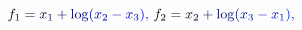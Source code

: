 \documentclass[12pt]{article}
\begin{document}
\makeatletter
\renewcommand*{\@textcolor}[3]{%
  \protect\leavevmode
  \begingroup
    \color#1{#2}#3%
  \endgroup
}
\makeatother
\begin{displaymath}
\mathcolor[RGB]{0,0,15}{f} _ { \mathcolor[RGB]{0,0,30}{1} } \mathcolor[RGB]{0,0,45}{=} \mathcolor[RGB]{0,0,60}{x} _ { \mathcolor[RGB]{0,0,75}{1} } \mathcolor[RGB]{0,0,90}{+} \mathrm { \mathcolor[RGB]{0,0,105}{l} \mathcolor[RGB]{0,0,120}{o} \mathcolor[RGB]{0,0,135}{g} } \mathcolor[RGB]{0,0,150}{(} \mathcolor[RGB]{0,0,165}{x} _ { \mathcolor[RGB]{0,0,180}{2} } \mathcolor[RGB]{0,0,195}{-} \mathcolor[RGB]{0,0,210}{x} _ { \mathcolor[RGB]{0,0,225}{3} } \mathcolor[RGB]{0,0,240}{)} \mathcolor[RGB]{0,0,255}{,} \mathcolor[RGB]{0,15,0}{\,
f} _ { \mathcolor[RGB]{0,15,15}{2} } \mathcolor[RGB]{0,15,30}{=} \mathcolor[RGB]{0,15,45}{x} _ { \mathcolor[RGB]{0,15,60}{2} } \mathcolor[RGB]{0,15,75}{+} \mathrm { \mathcolor[RGB]{0,15,90}{l} \mathcolor[RGB]{0,15,105}{o} \mathcolor[RGB]{0,15,120}{g} } \mathcolor[RGB]{0,15,135}{(} \mathcolor[RGB]{0,15,150}{x} _ { \mathcolor[RGB]{0,15,165}{3} } \mathcolor[RGB]{0,15,180}{-} \mathcolor[RGB]{0,15,195}{x} _ { \mathcolor[RGB]{0,15,210}{1} } \mathcolor[RGB]{0,15,225}{)} \mathcolor[RGB]{0,15,240}{,} \,
\end{displaymath}
\end{document}
